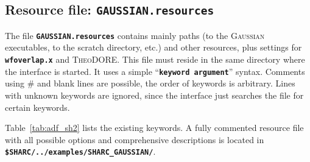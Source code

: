 \documentclass[a4paper,10pt,DIV=15,openany,twoside=false]{scrbook}
\newcommand{\ttt}[1]{\textbf{\texttt{#1}}}
\begin{document}
\subsection{Resource file: \ttt{GAUSSIAN.resources}}

The file \ttt{GAUSSIAN.resources} contains mainly paths (to the \textsc{Gaussian} executables, to the scratch directory, etc.) and other resources, plus settings for \ttt{wfoverlap.x} and \textsc{TheoDORE}. This file must reside in the same directory where the interface is started. It uses a simple ``\ttt{keyword argument}'' syntax. Comments using \# and blank lines are possible, the order of keywords is arbitrary. Lines with unknown keywords are ignored, since the interface just searches the file for certain keywords.

Table~\ref{tab:adf_sh2} lists the existing keywords.
A fully commented resource file with all possible options and comprehensive descriptions is located in \ttt{\$SHARC/../examples/SHARC\_GAUSSIAN/}.
\end{document}
